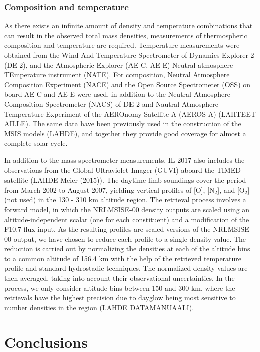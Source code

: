 \documentclass[referee,a4paper,12pt,traditabstract]{swsc}
\begin{document}
\begin{linenumbers}
\subsubsection{Composition and temperature}

As there exists an infinite amount of density and temperature combinations that can result in the observed total mass densities, measurements of thermospheric composition and temperature are required. Temperature measurements were obtained from the Wind And Temperature Spectrometer of Dynamics Explorer 2 (DE-2), and the Atmospheric Explorer (AE-C, AE-E) Neutral atmosphere TEmperature instrument (NATE). For composition, Neutral Atmosphere Composition Experiment (NACE) and the Open Source Spectrometer (OSS) on board AE-C and AE-E were used, in addition to the Neutral Atmosphere Composition Spectrometer (NACS) of DE-2 and Nautral Atmosphere Temperature Experiment of the AEROnomy Satellite A (AEROS-A) (LAHTEET AILLE). The same data have been previously used in the construction of the MSIS models (LAHDE), and together they provide good coverage for almost a complete solar cycle. 

In addition to the mass spectrometer measurements, IL-2017 also includes the observations from the Global Ultraviolet Imager (GUVI) aboard the TIMED satellite (LAHDE Meier (2015)). The daytime limb soundings cover the period from March 2002 to August 2007, yielding vertical profiles of [O], [$\mathrm{N_2}$], and [$\mathrm{O_2}$] (not used) in the 130 - 310 km altitude region. The retrieval process involves a forward model, in which the NRLMSISE-00 density outputs are scaled using an altitude-independent scalar (one for each constituent) and a modification of the F10.7 flux input. As the resulting profiles are scaled versions of the NRLMSISE-00 output, we have chosen to reduce each profile to a single density value. The reduction is carried out by normalizing the densities at each of the altitude bins to a common altitude of 156.4 km with the help of the retrieved temperature profile and standard hydrostadic techniques. The normalized density values are then averaged, taking into account their observational uncertainties. In the process, we only consider altitude bins between 150 and 300 km, where the retrievals have the highest precision due to dayglow being most sensitive to number densities in the region (LAHDE DATAMANUAALI). 



\section{Conclusions}






\end{linenumbers}
\end{document}
